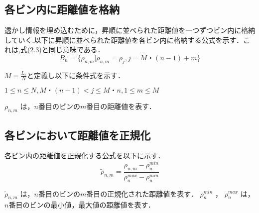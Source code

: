 \documentclass[11pt]{jreport}
\begin{document}
{\subsection{各ビン内に距離値を格納}
透かし情報を埋め込むために，昇順に並べられた距離値を一つずつビン内に格納していく.以下に昇順に並べられた距離値を各ビン内に格納する公式を示す．これは,式(2.3)と同じ意味である．
\begin{equation}
B_n=\{{\rho_{n,m}}|\rho_{n,m}=\rho_j,j=M・(n-1)+m\}
\end{equation}

\begin{math}
 M=\frac{L_v}{N}と定義し以下に条件式を示す．
 \end{math}\par
\begin{center}
\begin{math}
1\le n \le N,M・(n-1) < j \le M・n,1\le m \le M
 \end{math}\par
\end{center}

\begin{math}
\rho_{n,m}
\end{math}
は，\begin{math}n\end{math}番目のビンの\begin{math}m\end{math}番目の距離値を表す．
\subsection{各ビンにおいて距離値を正規化}
各ビン内の距離値を正規化する公式を以下に示す．
\begin{equation}
\tilde{\rho}_{n,m}=\frac{\rho_{n,m}-\rho^{min}_n}{\rho^{max}_n-\rho^{min}_n}
\end{equation}

\begin{math}
\tilde{\rho}_{n,m}
\end{math}
は，\begin{math}n\end{math}番目のビンの\begin{math}m\end{math}番目の正規化された距離値を表す．
\begin{math}
\rho^{min}_n
\end{math}
，
\begin{math}
\rho^{max}_n
\end{math}
は，\begin{math}n\end{math}番目のビンの最小値，最大値の距離値を表す．







}
\end{document}
